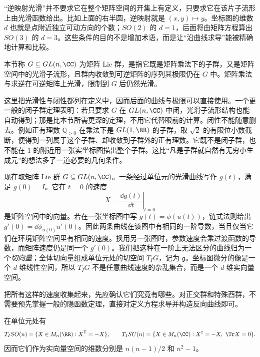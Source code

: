 “逆映射光滑”并不要求它在整个矩阵空间的开集上有定义，只要求它在该片子流形上由光滑函数给出。比如上面的右半圆，逆映射就是 $(x,y)\mapsto y$。坐标图的维数 $d$ 也就是点附近独立可动方向的个数；$SO(2)$ 的 $d=1$，后面将由矩阵方程算出 $SO(3)$ 的 $d=3$。这些条件的目的不是增加术语，而是让“沿曲线求导”能被精确地计算和比较。

\begin{definition}[矩阵 Lie 群]
本节称 $G\subseteq GL(n,\CC)$ 为矩阵 Lie 群，是指它既是矩阵乘法下的子群，又是矩阵空间中的光滑子流形，且群内收敛到可逆矩阵的序列其极限仍在 $G$ 中。矩阵乘法与求逆在可逆矩阵上光滑，限制到 $G$ 后仍然光滑。
\end{definition}

这里把光滑性与闭性都列在定义中，因而后面的曲线与极限可以直接使用。一个更一般的闭子群定理表明：若只要求 $G$ 在 $GL(n,\CC)$ 中闭，光滑子流形结构也能自动得到；那是比本节所需更深的定理，不用它代替眼前的计算。闭性不能随意删去。例如正有理数 $\mathbb Q_{>0}$ 在乘法下是 $GL(1,\RR)$ 的子群，取 $\sqrt2$ 的有限位小数截断，便得到一列属于这个子群、却收敛到子群外的正有理数。它既不是闭子群，也不能在 $1$ 的附近用一张实坐标图描出整个子群。这比“凡是子群就自然有无穷小生成元”的想法多了一道必要的几何条件。

现在取矩阵 Lie 群 $G\subseteq GL(n,\CC)$。一条经过单位元的光滑曲线写作 $g(t)$，满足 $g(0)=I$。它在 $t=0$ 的速度
\[
X=\left.\frac{\dd g(t)}{\dd t}\right|_{t=0}
\]
是矩阵空间中的向量。若在一张坐标图中写 $g(t)=\phi(u(t))$，链式法则给出 $g'(0)=\dd\phi_{u(0)}u'(0)$。因此两条曲线在该图中有相同的一阶导数，当且仅当它们在环境矩阵空间里有相同的速度。换用另一张图时，参数速度会乘过渡函数的导数，而矩阵速度仍是同一个 $g'(0)$。我们把这种在一阶上无法区分的曲线归为一个\emph{切向量}；全体切向量组成单位元处的切空间 $T_IG$，记为 $\mathfrak g$。坐标图微分的像是一个 $d$ 维线性空间，所以 $T_IG$ 不是任意曲线速度的杂乱集合，而是一个 $d$ 维实向量空间。

把所有这样的速度收集起来，先应确认它们究竟有哪些。对正交群和特殊酉群，不需要预先掌握一般的隐函数定理，直接对定义方程求导并构造反向曲线即可。

\begin{proposition}[正交群与特殊酉群的切空间]
在单位元处有
\[
T_I SO(n)=\{X\in M_n(\RR):X^{\mathsf T}=-X\},\qquad
T_I SU(n)=\{X\in M_n(\CC):X^\dagger=-X,\ \Tr X=0\}.
\]
因而它们作为实向量空间的维数分别是 $n(n-1)/2$ 和 $n^2-1$。
\end{proposition}

